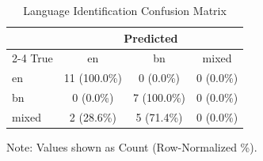 \begin{table}[htbp]
\centering
\caption{Language Identification Confusion Matrix}
\label{tab:lang_confusion}
\begin{tabular}{lccc}
\toprule
& \multicolumn{3}{c}{Predicted} \\
\cmidrule{2-4}
True & en & bn & mixed \\
\midrule
en & 11 (100.0\%) & 0 (0.0\%) & 0 (0.0\%) \\
bn & 0 (0.0\%) & 7 (100.0\%) & 0 (0.0\%) \\
mixed & 2 (28.6\%) & 5 (71.4\%) & 0 (0.0\%) \\
\bottomrule
\end{tabular}
\begin{tablenotes}
\small
\item Note: Values shown as Count (Row-Normalized \%).
\end{tablenotes}
\end{table}
